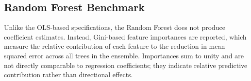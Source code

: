 \documentclass[12pt,a4paper]{report}
\begin{document}
\subsection{Random Forest Benchmark}

Unlike the OLS-based specifications, the Random Forest does not produce coefficient estimates. Instead, Gini-based feature importances are reported, which measure the relative contribution of each feature to the reduction in mean squared error across all trees in the ensemble. Importances sum to unity and are not directly comparable to regression coefficients; they indicate relative predictive contribution rather than directional effects.

\begin{table}[H]
\centering
\caption{Model 6: Random Forest --- Feature Importances Across Asset Classes}
\label{tab:model6_importances}
\end{table}
\end{document}
